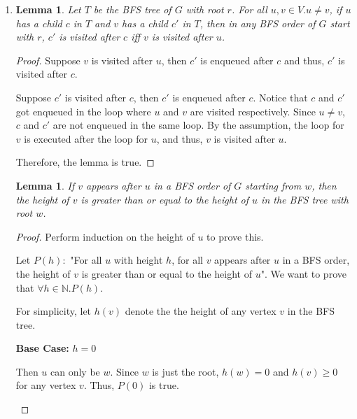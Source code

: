 \documentclass[10pt]{article}
\newtheorem{lemma}[theorem]{Lemma}
\begin{document}
\begin{enumerate}
	\item
	\begin{comment}
		Prove that any breadth first search order of $G$ is also a breadth
		frist search order of $G^2$
	\end{comment}
		\begin{lemma}
			Let $T$ be the BFS tree of $G$ with root $r$.
			For all $u, v \in V. u \neq v$, if $u$ has a child $c$ in $T$ and
			$v$ has a child $c'$ in $T$, then in any BFS order of $G$ start
			with $r$, $c'$ is visited after $c$ iff $v$ is visited after $u$.
		\end{lemma}
		\begin{proof}
			Suppose $v$ is visited after $u$, then $c'$ is enqueued after $c$
			and thus, $c'$ is visited after $c$. 

			Suppose $c'$ is visited after $c$, then $c'$ is enqueued after $c$.
			Notice that $c$ and $c'$ got enqueued in the loop where $u$ and $v$
			are visited respectively. 
			Since $u \neq v$, $c$ and $c'$ are not enqueued in the same loop.
			By the assumption, the loop for $v$ is executed after the loop for
			$u$, and thus, $v$ is visited after $u$.

			Therefore, the lemma is true.
		\end{proof}

		\begin{lemma}
			If $v$ appears after $u$ in a BFS order of $G$ starting from $w$,
			then the height of $v$ is greater than or equal to the height of
			$u$ in the BFS tree with root $w$.
		\end{lemma}
		\begin{proof}
			Perform induction on the height of $u$ to prove this.

			Let $P(h):$ "For all $u$ with height $h$, for all $v$ appears after
			$u$ in a BFS order, the height of $v$ is greater than or equal to
			the height of $u$".
			We want to prove that $\forall h \in \mathbb{N}. P(h)$. 

			For simplicity, let $h(v)$ denote the the height of any vertex $v$
			in the BFS tree. 

			\textbf{Base Case:} $h=0$
			\begin{addmargin}[1em]{0em}
				Then $u$ can only be $w$.
				Since $w$ is just the root, $h(w) = 0$ and $h(v) \geq 0$ for
				any vertex $v$.
				Thus, $P(0)$ is true.
			\end{addmargin}


\end{proof}
\end{enumerate}
\end{document}
